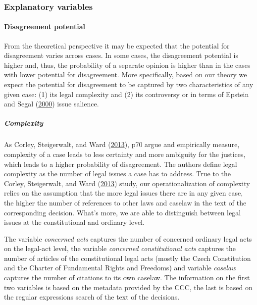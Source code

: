 \documentclass[
  11pt,
]{article}
\begin{document}
\hypertarget{explanatory-variables}{%
\subsubsection{Explanatory variables}\label{explanatory-variables}}

\hypertarget{disagreement-potential}{%
\paragraph*{Disagreement potential}\label{disagreement-potential}}

From the theoretical perspective it may be expected that the potential
for disagreement varies across cases. In some cases, the disagreement
potential is higher and, thus, the probability of a separate opinion is
higher than in the cases with lower potential for disagreement. More
specifically, based on our theory we expect the potential for
disagreement to be captured by two characteristics of any given case:
(1) its legal complexity and (2) its controversy or in terms of Epstein
and Segal
(\protect\hyperlink{ref-epsteinMeasuringIssueSalience2000}{2000}) issue
salience.

\hypertarget{complexity}{%
\subparagraph*{Complexity}\label{complexity}}

As Corley, Steigerwalt, and Ward
(\protect\hyperlink{ref-corleyPuzzleUnanimityConsensus2013}{2013}), p70
argue and empirically measure, complexity of a case leads to less
certainty and more ambiguity for the justices, which leads to a higher
probability of disagreement. The authors define legal complexity as the
number of legal issues a case has to address. True to the Corley,
Steigerwalt, and Ward
(\protect\hyperlink{ref-corleyPuzzleUnanimityConsensus2013}{2013})
study, our operationalization of complexity relies on the assumption
that the more legal issues there are in any given case, the higher the
number of references to other laws and caselaw in the text of the
corresponding decision. What's more, we are able to distinguish between
legal issues at the constitutional and ordinary level.

The variable \emph{concerned acts} captures the number of concerned
ordinary legal acts on the legal-act level, the variable \emph{concerned
constitutional acts} captures the number of articles of the
constitutional legal acts (mostly the Czech Constitution and the Charter
of Fundamental Rights and Freedoms) and variable \emph{caselaw} captures
the number of citations to its own caselaw. The information on the first
two variables is based on the metadata provided by the CCC, the last is
based on the regular expressions search of the text of the decisions.
\end{document}
